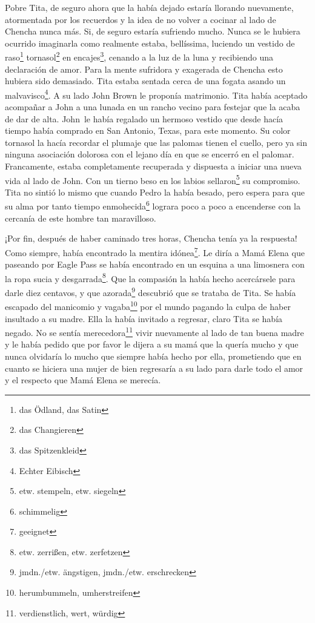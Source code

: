 Pobre Tita, de seguro ahora que la había dejado estaría llorando
nuevamente, atormentada por los recuerdos y la idea de no volver a
cocinar al lado de Chencha nunca más. Si, de seguro estaría sufriendo
mucho. Nunca se le hubiera ocurrido imaginarla como realmente estaba,
bellíssima, luciendo un vestido de raso\footnote{das Ödland, das Satin} tornasol\footnote{das Changieren} en encajes\footnote{das Spitzenkleid},
cenando a la luz de la luna y recibiendo una declaración de amor. Para
la mente sufridora y exagerada de Chencha esto hubiera sido demasiado.
Tita estaba sentada cerca de una fogata asando un malvavisco\footnote{Echter Eibisch}.
A su lado John Brown le proponía matrimonio. Tita había aceptado acompañar a
John a una lunada en un rancho vecino para festejar que la acaba de
dar de alta. John~le había regalado un hermoso vestido que desde
hacía tiempo había comprado en San Antonio, Texas, para este momento. Su
color tornasol la hacía recordar el plumaje que las palomas tienen el
cuello, pero ya sin ninguna asociación dolorosa con el lejano día en que
se encerró en el palomar. Francamente, estaba completamente recuperada y
dispuesta a iniciar una nueva vida al lado de John. Con un tierno beso
en los labios sellaron\footnote{etw. stempeln, etw. siegeln} su
compromiso. Tita no sintió lo mismo que cuando Pedro la había besado,
pero espera para que su alma por tanto tiempo enmohecida\footnote{schimmelig} lograra poco a poco a encenderse
con la cercanía de este hombre tan maravilloso.

¡Por fin, después de haber caminado tres horas, Chencha tenía ya la
respuesta! Como siempre, había encontrado la mentira idónea\footnote{geeignet}.
Le diría a Mamá Elena que paseando por Eagle Pass se había encontrado
en un esquina a una limosnera con la ropa sucia y desgarrada\footnote{etw. zerrißen, etw. zerfetzen}.
Que la compasión la había hecho acercársele para darle diez centavos, y
que azorada\footnote{jmdn./etw. ängstigen, jmdn./etw. erschrecken}
descubrió que se trataba de Tita. Se había escapado del manicomio y vagaba\footnote{herumbummeln, umherstreifen} por el
mundo pagando la culpa de haber insultado a su madre. Ella la había
invitado a regresar, claro Tita se había negado. No se sentía merecedora\footnote{verdienstlich, wert, würdig} vivir nuevamente
al lado de tan buena madre y le había pedido que por favor le dijera a su
mamá que la quería mucho y que nunca olvidaría lo mucho que siempre había
hecho por ella, prometiendo que en cuanto se hiciera una mujer de bien
regresaría a su lado para darle todo el amor y el respecto que Mamá Elena
se merecía.

